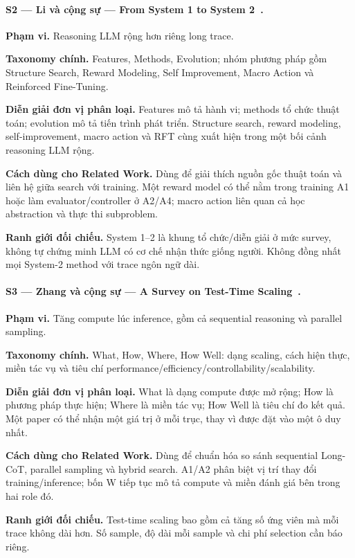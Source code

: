 \paragraph{S2 — Li và cộng sự — From System 1 to System 2~\cite{survey_li2025system}.}
\noindent\textbf{Phạm vi.} Reasoning LLM rộng hơn riêng long trace.\par
\noindent\textbf{Taxonomy chính.} Features, Methods, Evolution; nhóm phương pháp gồm Structure Search, Reward Modeling, Self Improvement, Macro Action và Reinforced Fine-Tuning.\par
\noindent\textbf{Diễn giải đơn vị phân loại.} Features mô tả hành vi; methods tổ chức thuật toán; evolution mô tả tiến trình phát triển. Structure search, reward modeling, self-improvement, macro action và RFT cùng xuất hiện trong một bối cảnh reasoning LLM rộng.\par
\noindent\textbf{Cách dùng cho Related Work.} Dùng để giải thích nguồn gốc thuật toán và liên hệ giữa search với training. Một reward model có thể nằm trong training A1 hoặc làm evaluator/controller ở A2/A4; macro action liên quan cả học abstraction và thực thi subproblem.\par
\noindent\textbf{Ranh giới đối chiếu.} System 1–2 là khung tổ chức/diễn giải ở mức survey, không tự chứng minh LLM có cơ chế nhận thức giống người. Không đồng nhất mọi System-2 method với trace ngôn ngữ dài.\par
{}

\paragraph{S3 — Zhang và cộng sự — A Survey on Test-Time Scaling~\cite{survey_zhang2025testtime}.}
\noindent\textbf{Phạm vi.} Tăng compute lúc inference, gồm cả sequential reasoning và parallel sampling.\par
\noindent\textbf{Taxonomy chính.} What, How, Where, How Well: dạng scaling, cách hiện thực, miền tác vụ và tiêu chí performance/efficiency/controllability/scalability.\par
\noindent\textbf{Diễn giải đơn vị phân loại.} What là dạng compute được mở rộng; How là phương pháp thực hiện; Where là miền tác vụ; How Well là tiêu chí đo kết quả. Một paper có thể nhận một giá trị ở mỗi trục, thay vì được đặt vào một ô duy nhất.\par
\noindent\textbf{Cách dùng cho Related Work.} Dùng để chuẩn hóa so sánh sequential Long-CoT, parallel sampling và hybrid search. A1/A2 phân biệt vị trí thay đổi training/inference; bốn W tiếp tục mô tả compute và miền đánh giá bên trong hai role đó.\par
\noindent\textbf{Ranh giới đối chiếu.} Test-time scaling bao gồm cả tăng số ứng viên mà mỗi trace không dài hơn. Số sample, độ dài mỗi sample và chi phí selection cần báo riêng.\par
{}

